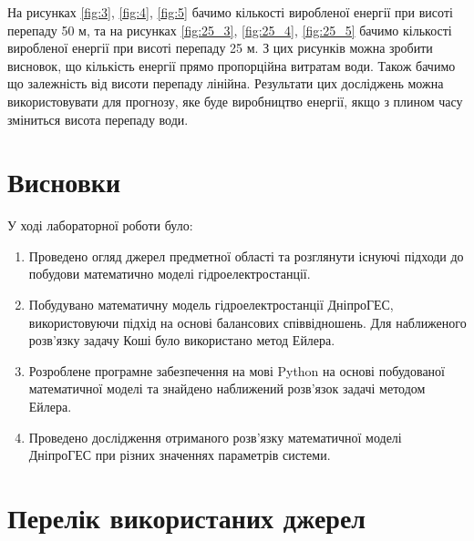 \documentclass[12pt]{article}
\numberwithin{equation}{section}
\numberwithin{figure}{section}
\begin{document}
На рисунках \ref{fig:3}, \ref{fig:4}, \ref{fig:5} бачимо кількості виробленої енергії при висоті перепаду 50 м, та на рисунках \ref{fig:25_3}, \ref{fig:25_4}, \ref{fig:25_5} бачимо кількості виробленої енергії при висоті перепаду 25 м. З цих рисунків можна зробити висновок, що кількість енергії прямо пропорційна витратам води. Також бачимо що залежність від висоти перепаду лінійна. Результати цих досліджень можна використовувати для прогнозу, яке буде виробництво енергії, якщо з плином часу зміниться висота перепаду води.

\section{Висновки}

У ході лабораторної роботи було:
\begin{enumerate}
\item Проведено огляд джерел предметної області та розглянути існуючі підходи до побудови математично моделі гідроелектростанції.

\item Побудувано математичну модель гідроелектростанції ДніпроГЕС, використовуючи підхід на основі балансових співвідношень. Для наближеного розв'язку задачу Коші було використано метод Ейлера.

\item Розроблене програмне забезпечення на мові Python на основі побудованої математичної моделі та знайдено наближений розв'язок задачі методом Ейлера.

\item Проведено дослідження отриманого розв'язку математичної моделі ДніпроГЕС при різних значеннях параметрів системи.
\end{enumerate}

\newpage

\section{Перелік використаних джерел}
\end{document}
